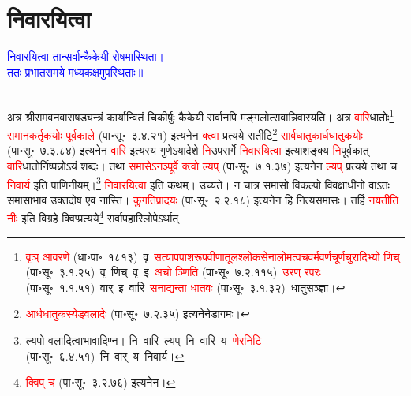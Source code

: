 \section[निवारयित्वा]{निवारयित्वा}
\centering\textcolor{blue}{निवारयित्वा तान्सर्वान्कैकेयी रोषमास्थिता।\nopagebreak\\
ततः प्रभातसमये मध्यकक्षमुपस्थिताः॥}\nopagebreak\\
\\
\begin{sloppypar}\justifying\noindent\hspace{10mm} अत्र श्रीराम\-वन\-वास\-षड्यन्त्रं कार्यान्वितं चिकीर्षुः कैकेयी सर्वानपि मङ्गलोत्सवान्निवारयति। अत्र \textcolor{red}{वारि}\-धातोः\footnote{\textcolor{red}{वृञ् आवरणे} (धा॰पा॰~१८१३)~\arrow वृ~\arrow \textcolor{red}{सत्याप\-पाश\-रूप\-वीणा\-तूल\-श्लोक\-सेना\-लोम\-त्वच\-वर्म\-वर्ण\-चूर्ण\-चुरादिभ्यो णिच्} (पा॰सू॰~३.१.२५)~\arrow वृ~णिच्~\arrow वृ~इ~\arrow \textcolor{red}{अचो ञ्णिति} (पा॰सू॰~७.२.११५)~\arrow \textcolor{red}{उरण् रपरः} (पा॰सू॰~१.१.५१)~\arrow वार्~इ~\arrow वारि~\arrow \textcolor{red}{सनाद्यन्ता धातवः} (पा॰सू॰~३.१.३२)~\arrow धातु\-सञ्ज्ञा।} \textcolor{red}{समान\-कर्तृकयोः पूर्व\-काले} (पा॰सू॰~३.४.२१) इत्यनेन \textcolor{red}{क्त्वा} प्रत्यये सतीटि\footnote{\textcolor{red}{आर्धधातुकस्येड्वलादेः} (पा॰सू॰~७.२.३५) इत्यनेनेडागमः।} \textcolor{red}{सार्वधातुकार्ध\-धातुकयोः} (पा॰सू॰~७.३.८४) इत्यनेन \textcolor{red}{वारि} इत्यस्य गुणेऽयादेशे \textcolor{red}{नि}\-उपसर्गे \textcolor{red}{निवारयित्वा} इत्याशङ्क्य \textcolor{red}{नि}\-पूर्वकात् \textcolor{red}{वारि}\-धातोर्निष्पन्नोऽयं शब्दः। तथा \textcolor{red}{समासेऽनञ्पूर्वे क्त्वो ल्यप्} (पा॰सू॰~७.१.३७) इत्यनेन \textcolor{red}{ल्यप्} प्रत्यये तथा च \textcolor{red}{निवार्य} इति पाणिनीयम्।\footnote{ल्यपो वलादित्वाभावादिण्न। नि~वारि~ल्यप्~\arrow नि~वारि~य~\arrow \textcolor{red}{णेरनिटि} (पा॰सू॰~६.४.५१)~\arrow नि~वार्~य~\arrow निवार्य।} \textcolor{red}{निवारयित्वा} इति कथम्।
उच्यते।
न चात्र समासो विकल्पो विवक्षाधीनो वाऽतः समासाभाव उक्त\-दोष एव नास्ति। \textcolor{red}{कु\-गति\-प्रादयः} (पा॰सू॰~२.२.१८) इत्यनेन हि नित्यसमासः। तर्हि 
\textcolor{red}{नयतीति नीः} इति विग्रहे क्विप्प्रत्यये\footnote{\textcolor{red}{क्विप् च} (पा॰सू॰~३.२.७६) इत्यनेन।} सर्वापहारि\-लोपेऽर्थात्

\end{sloppypar}
